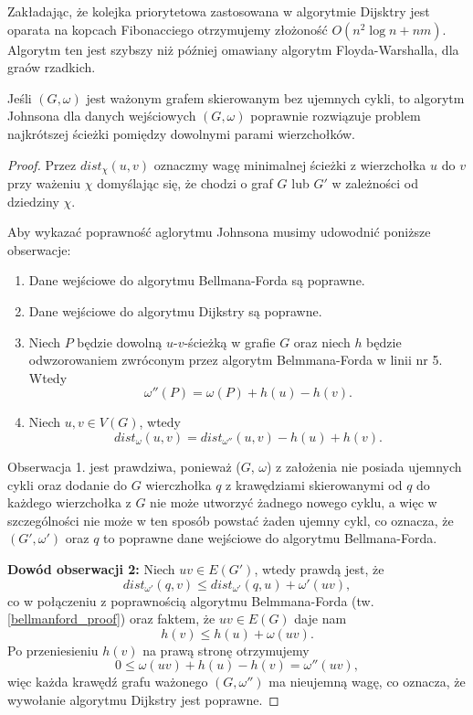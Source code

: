 Zakładając, że kolejka priorytetowa zastosowana 
w algorytmie Dijsktry jest oparata na kopcach 
Fibonacciego otrzymujemy złożoność $O(n^2\log n + nm)$. Algorytm 
ten jest szybszy niż później omawiany 
algorytm Floyda-Warshalla, dla graów rzadkich. 

\begin{theorem}
	Jeśli $(G, \omega)$ jest ważonym grafem skierowanym
	bez ujemnych cykli, to algorytm Johnsona dla 
	danych wejściowych $(G, \omega)$ poprawnie
	rozwiązuje problem najkrótszej ścieżki 
	pomiędzy dowolnymi parami wierzchołków.
	
	\begin{proof}
		Przez $dist_\chi(u, v)$ oznaczmy wagę minimalnej ścieżki
		z wierzchołka $u$ do $v$ przy ważeniu $\chi$ domyślając się, 
		że chodzi o graf $G$ lub $G'$ w zależności od dziedziny $\chi$.
		
		Aby wykazać poprawność aglorytmu Johnsona 
		musimy udowodnić poniższe obserwacje:
		\begin{enumerate}
			\item Dane wejściowe do 
			algorytmu Bellmana-Forda są poprawne.
			\item Dane wejściowe do 
			algorytmu Dijkstry są poprawne.
			\item Niech $P$ będzie dowolną
			$u$-$v$-ścieżką w grafie $G$ oraz niech $h$
			będzie odwzorowaniem zwróconym przez algorytm
			Belmmana-Forda w linii nr 5. Wtedy
			\[\omega''(P) = \omega(P) +  h(u) - h(v).\]
			\item Niech $u, v \in V(G)$, wtedy
			\[dist_{\omega}(u, v) = dist_{\omega''}(u, v) - h(u) + h(v).\]
		\end{enumerate}
		
		Obserwacja 1. jest prawdziwa, ponieważ ($G$, $\omega$)
		z założenia nie posiada ujemnych cykli oraz
		dodanie do $G$ wierczhołka $q$ z krawędziami skierowanymi
		od $q$ do każdego wierzchołka z $G$ nie może utworzyć
		żadnego nowego cyklu, a więc w szczególności nie może
		w ten sposób powstać żaden ujemny cykl, co oznacza, że
		$(G', \omega')$ oraz $q$ to poprawne dane wejściowe
		do algorytmu Bellmana-Forda.
		
		\textbf{Dowód obserwacji 2:} Niech $uv \in E(G')$, 
		wtedy prawdą jest, że
		\[dist_{\omega'}(q, v) \leq dist_{\omega'}(q, u) + \omega'(uv),\]
		co w połączeniu z poprawnością algorytmu Belmmana-Forda (tw.
		\ref{bellmanford_proof}) oraz faktem, że 
		$uv \in E(G)$ daje nam
		\[h(v) \leq h(u) + \omega(uv).\]
		Po przeniesieniu $h(v)$ na prawą stronę otrzymujemy 
		\[0 \leq \omega(uv) + h(u) - h(v) = \omega''(uv),\]
		więc każda krawędź grafu ważonego $(G, \omega'')$ ma
		nieujemną wagę, co oznacza, że wywołanie algorytmu 
		Dijkstry jest poprawne.  
		

\end{proof}
\end{theorem}
